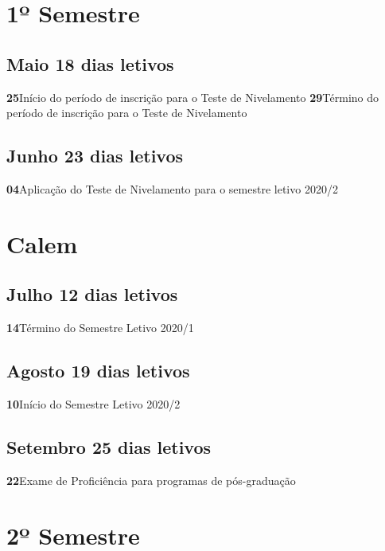 \documentclass[thesis]{hmcposter}
\begin{document}
\begin{poster}
\section{\hfill \color{hmcorange}1º Semestre}
								\subsection{Maio \hfill 18 dias letivos}\textbf{25}\qquad Início do período de inscrição para o Teste de Nivelamento \newline \null\textbf{29}\qquad Término do período de inscrição para o Teste de Nivelamento \newline \null\subsection{Junho \hfill 23 dias letivos}\textbf{04}\qquad Aplicação do Teste de Nivelamento para o semestre letivo 2020/2 \newline \null\newpage
\section{\color{hmcorange}Calem}\subsection{Julho \hfill 12 dias letivos}\textbf{14}\qquad Término do Semestre Letivo 2020/1 \newline \null\subsection{Agosto \hfill 19 dias letivos}\textbf{10}\qquad Início do Semestre Letivo 2020/2 \newline \null\subsection{Setembro \hfill 25 dias letivos}\textbf{22}\qquad Exame de Proficiência para programas de pós-graduação \newline \null\vfill\null
\columnbreak
\section{\hfill \color{hmcorange}2º Semestre}

\end{poster}
\end{document}
